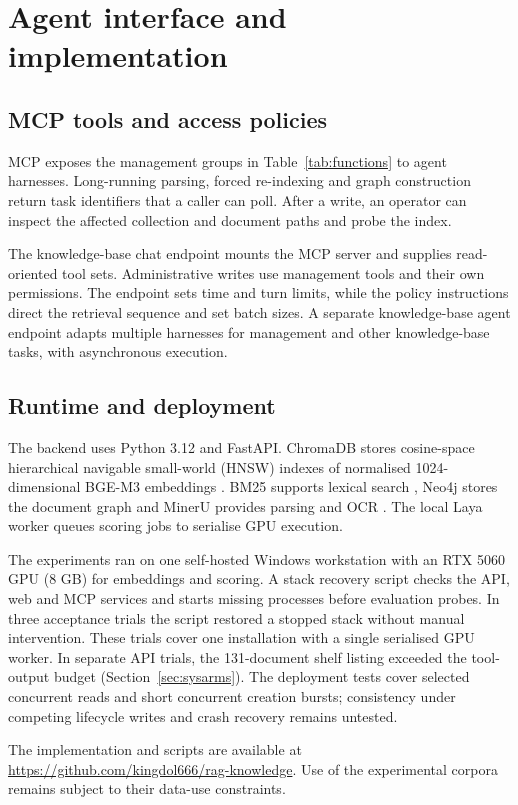 \section{Agent interface and implementation}
\label{sec:implementation}
\label{sec:impl}

\subsection{MCP tools and access policies}
\label{sec:impl-tools}

MCP exposes the management groups in Table~\ref{tab:functions} to agent
harnesses. Long-running parsing, forced re-indexing and graph construction
return task identifiers that a caller can poll. After a write, an operator
can inspect the affected collection and document paths and probe the index.

 The knowledge-base chat endpoint mounts the MCP server and supplies
read-oriented tool sets. Administrative writes use management tools and
their own permissions. The endpoint sets time and turn limits, while the
policy instructions direct the retrieval sequence and set batch sizes.
A separate knowledge-base agent endpoint adapts multiple harnesses for management and
other knowledge-base tasks, with asynchronous execution.

\subsection{Runtime and deployment}
\label{sec:impl-runtime}

The backend uses Python 3.12 and FastAPI. ChromaDB stores cosine-space
hierarchical navigable small-world (HNSW)
indexes of normalised 1024-dimensional BGE-M3 embeddings
\cite{chroma,hnsw,bge-m3}. BM25 supports lexical search \cite{bm25}, Neo4j
stores the document graph \cite{neo4j} and MinerU provides parsing and OCR
\cite{mineru}. The local Laya worker queues scoring jobs to serialise GPU
execution.

The experiments ran on one self-hosted Windows workstation with an RTX
5060 GPU (8 GB) for embeddings and scoring. A stack recovery script checks
the API, web and MCP services and starts missing processes before evaluation
probes. In three acceptance trials the script restored a stopped stack
without manual intervention. These trials cover one installation with a
single serialised GPU worker. In separate API trials, the 131-document
shelf listing exceeded the tool-output budget (Section~\ref{sec:sysarms}).
The deployment tests cover selected concurrent reads and short concurrent
creation bursts; consistency under competing lifecycle writes and crash
recovery remains untested.

The implementation and scripts are available at
\url{https://github.com/kingdol666/rag-knowledge}. Use of the experimental
corpora remains subject to their data-use constraints.
